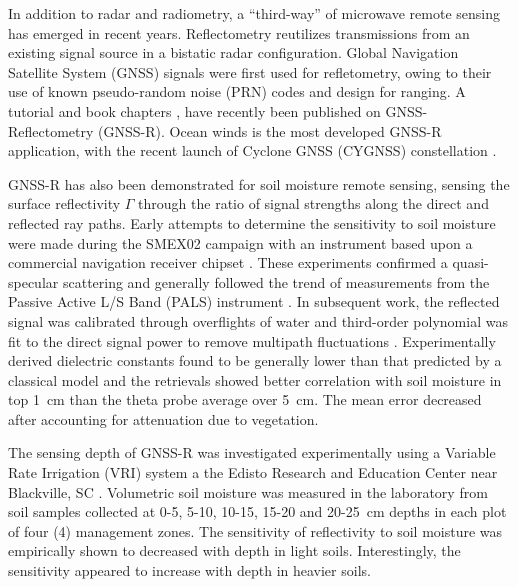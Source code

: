 \documentclass[draftcls,onecolumn]{IEEEtran}  %
\begin{document}

In addition to  radar and  radiometry, a  ``third-way'' of microwave remote sensing has emerged in recent years. 
Reflectometry reutilizes transmissions from an existing signal source in a bistatic radar configuration. 
Global Navigation Satellite System (GNSS) signals were first used for refletometry, owing to their use of known pseudo-random noise (PRN) codes and design for ranging. 
A tutorial \cite{Zavorotny2014} and book chapters \cite{Gleason2009}, \cite{Jina} have recently been published on GNSS-Reflectometry (GNSS-R).
Ocean winds is the most developed GNSS-R application, with the recent launch of Cyclone GNSS (CYGNSS) constellation \cite{Ruf2016}. 

GNSS-R has also been demonstrated for soil moisture remote sensing, sensing the surface reflectivity $\Gamma$ through the ratio of signal strengths along the direct and reflected ray paths. 
Early attempts to determine the sensitivity to soil moisture were made during the SMEX02 campaign with an instrument based upon a commercial navigation receiver chipset \cite{Masters2004}.
These experiments confirmed a  quasi-specular scattering and generally followed the trend of measurements from the  Passive Active L/S Band (PALS) instrument \cite{Narayan2004}. 
In subsequent work, the reflected signal was calibrated through overflights of water and third-order polynomial was fit to the direct signal power to remove multipath fluctuations \cite{katzbSMEX02}.
Experimentally derived dielectric constants found to be generally lower than that predicted by a classical model \cite{Wang1980} 
and the retrievals showed better correlation with soil moisture in top 1~cm than the theta probe average over 5~cm. 
The mean error decreased after accounting for attenuation due to vegetation. 


The sensing depth of GNSS-R was investigated experimentally using a Variable Rate Irrigation (VRI) system a the 
Edisto Research and Education Center near Blackville, SC \cite{Privette2011}.
Volumetric soil moisture was measured in the laboratory from soil samples  collected at 0-5, 5-10, 10-15, 15-20 and 20-25~cm depths 
in each plot of four (4) management zones. 
The sensitivity of reflectivity to soil moisture was empirically shown to 
decreased with depth in light soils. Interestingly, the sensitivity appeared to increase with depth in heavier soils. 
\end{document}
